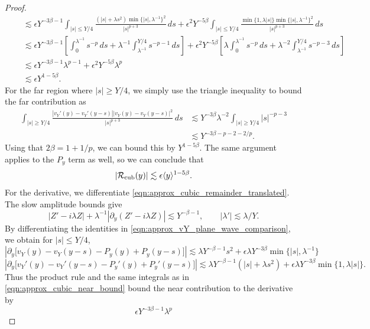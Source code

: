 \documentclass[11pt]{amsart}
\theoremstyle{definition}
\theoremstyle{remark}
\numberwithin{equation}{section}
\newcommand{\mc}[1]{\mathcal{#1}}
\newcommand{\ang}[1]{\langle #1 \rangle}
\begin{document}
\begin{proof}
\begin{equation}
\begin{aligned}
            &\quad\lesssim\epsilon Y^{-3\beta-1}\int_{|s|\leq Y/4}
            \frac{(|s|+\lambda s^2)\min\{|s|,\lambda^{-1}\}^2}{|s|^{p+3}}\,ds +\epsilon^2Y^{-5\beta}\int_{|s|\leq Y/4}
            \frac{\min\{1,\lambda|s|\}\min\{|s|,\lambda^{-1}\}^2}{|s|^{p+3}}\,ds\\
            &\quad\lesssim\epsilon Y^{-3\beta-1}\left[
            \int_0^{\lambda^{-1}}s^{-p}\,ds
            +\lambda^{-1}\int_{\lambda^{-1}}^{Y/4}s^{-p-1}\,ds\right] +\epsilon^2Y^{-5\beta}\left[
            \lambda\int_0^{\lambda^{-1}}s^{-p}\,ds
            +\lambda^{-2}\int_{\lambda^{-1}}^{Y/4}s^{-p-3}\,ds\right]\\
            &\quad\lesssim\epsilon Y^{-3\beta-1}\lambda^{p-1}
            +\epsilon^2Y^{-5\beta}\lambda^p\\
            &\quad\lesssim\epsilon Y^{1-5\beta}.
        \end{aligned}
    \end{equation}
    For the far region where $|s| \geq Y/4$, we simply use the triangle inequality to bound the far contribution as 
    \begin{align*}
        \int_{|s| \geq Y/4}\frac{|v_Y'(y)-v_Y'(y-s)||v_Y(y)-v_Y(y-s)|^2}{|s|^{p+3}}\,ds & \lesssim Y^{-3\beta}\lambda^{-2} \int_{|s| \geq Y/4}|s|^{-p-3} \\
        & \lesssim Y^{-3\beta - p - 2 - 2/p}.
    \end{align*}
    Using that $2\beta = 1 + 1/p$, we can bound this by $Y^{1 - 5\beta}$. The same argument applies to the $P_y$ term as well, so we can conclude that 
    \[|\mc{R}_{\textup{cub}}(y)| \lesssim \epsilon \ang{y}^{1 - 5\beta}.\]
    For the derivative, we differentiate \eqref{eqn:approx_cubic_remainder_translated}. The slow amplitude bounds give
    \[
        |Z'-i\lambda Z|+\lambda^{-1}|\partial_y(Z'-i\lambda Z)|
        \lesssim Y^{-\beta-1},\qquad |\lambda'|\lesssim\lambda/Y.
    \]
    By differentiating the identities in \eqref{eqn:approx_vY_plane_wave_comparison}, we obtain for $|s|\leq Y/4$,
    \[\left|\partial_y\bigl[v_Y(y)-v_Y(y-s)-P_y(y)+P_y(y-s)\bigr]\right| \lesssim\lambda Y^{-\beta-1}s^2
        +\epsilon\lambda Y^{-3\beta}\min\{|s|,\lambda^{-1}\}\]
    \[\left|\partial_y\bigl[v_Y'(y)-v_Y'(y-s)-P_y'(y)+P_y'(y-s)\bigr]\right| \lesssim\lambda Y^{-\beta-1}(|s|+\lambda s^2)
        +\epsilon\lambda Y^{-3\beta}\min\{1,\lambda|s|\}.\]
    Thus the product rule and the same integrals as in \eqref{eqn:approx_cubic_near_bound} bound the near contribution to the derivative by
    \[
        \epsilon Y^{-3\beta-1}\lambda^p
\]
\end{proof}
\end{document}
